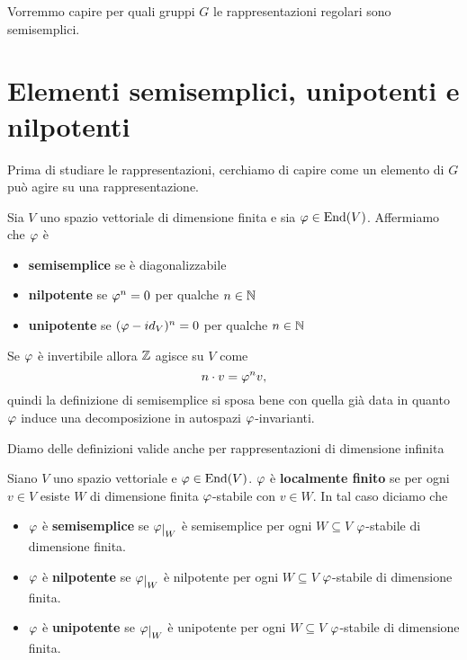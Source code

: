 Vorremmo capire per quali gruppi $G$ le rappresentazioni regolari sono semisemplici.

\section{Elementi semisemplici, unipotenti e nilpotenti}
Prima di studiare le rappresentazioni, cerchiamo di capire come un elemento di $G$ pu\`o agire su una rappresentazione.

\begin{definition}
Sia $V$ uno spazio vettoriale di dimensione finita e sia $\varphi\in\operatorname{End}(V)$. Affermiamo che $\varphi$ \`e
\begin{itemize}
    \item \textbf{semisemplice} se \`e diagonalizzabile
    \item \textbf{nilpotente} se $\varphi^n=0$ per qualche $n\in\mathbb{N}$
    \item \textbf{unipotente} se $(\varphi-id_V)^n=0$ per qualche $n\in\mathbb{N}$
\end{itemize}
\end{definition}

\begin{remark}
Se $\varphi$ \`e invertibile allora $\mathbb{Z}$ agisce su $V$ come
\[n\cdot v=\varphi^nv,\]
quindi la definizione di semisemplice si sposa bene con quella gi\`a data in quanto $\varphi$ induce una decomposizione in autospazi $\varphi$-invarianti.
\end{remark}

Diamo delle definizioni valide anche per rappresentazioni di dimensione infinita

\begin{definition}
Siano $V$ uno spazio vettoriale e $\varphi\in \operatorname{End}(V)$. $\varphi$ \`e \textbf{localmente finito} se per ogni $v\in V$ esiste $W$ di dimensione finita $\varphi$-stabile con $v\in W$. In tal caso diciamo che
\begin{itemize}
    \item $\varphi$ \`e \textbf{semisemplice} se $\vp\res W$ \`e semisemplice per ogni $W\subseteq V$ $\varphi$-stabile di dimensione finita.
    \item $\varphi$ \`e \textbf{nilpotente} se $\vp\res W$ \`e nilpotente per ogni $W\subseteq V$ $\varphi$-stabile di dimensione finita.
    \item $\varphi$ \`e \textbf{unipotente} se $\vp\res W$ \`e unipotente per ogni $W\subseteq V$ $\varphi$-stabile di dimensione finita.
\end{itemize}
\end{definition}

